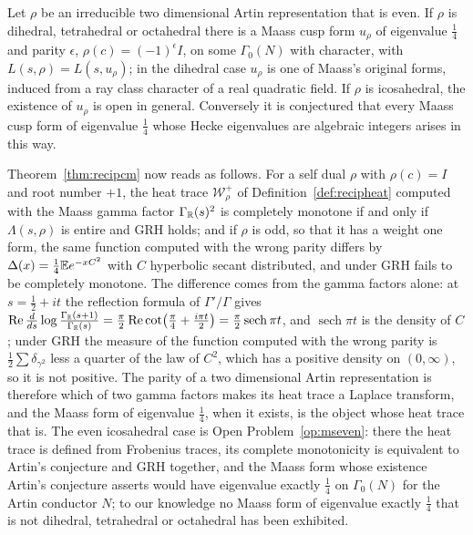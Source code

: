 \begin{theorem}\label{thm:msgalois}
Let $\rho$ be an irreducible two dimensional Artin representation that is even. If $\rho$ is dihedral, tetrahedral or octahedral there is a Maass cusp form $u_\rho$ of eigenvalue $\frac14$ and parity $\epsilon$, $\rho(c)=(-1)^\epsilon I$, on some $\Gamma_0(N)$ with character, with $L(s,\rho)=L(s,u_\rho)$; in the dihedral case $u_\rho$ is one of Maass's original forms, induced from a ray class character of a real quadratic field. If $\rho$ is icosahedral, the existence of $u_\rho$ is open in general. Conversely it is conjectured that every Maass cusp form of eigenvalue $\frac14$ whose Hecke eigenvalues are algebraic integers arises in this way.
\end{theorem}

Theorem~\ref{thm:recipcm} now reads as follows. For a self dual $\rho$ with $\rho(c)=I$ and root number $+1$, the heat trace $\mathcal W_\rho^+$ of Definition~\ref{def:recipheat} computed with the Maass gamma factor $\Gamma_{\mathbb{R}}(s)^2$ is completely monotone if and only if $\Lambda(s,\rho)$ is entire and GRH holds; and if $\rho$ is odd, so that it has a weight one form, the same function computed with the wrong parity differs by $\Delta(x)=\frac14\mathbb{E} e^{-xC^2}$ with $C$ hyperbolic secant distributed, and under GRH fails to be completely monotone. The difference comes from the gamma factors alone: at $s=\frac12+it$ the reflection formula of $\Gamma'/\Gamma$ gives $\operatorname{Re}\frac d{ds}\log\frac{\Gamma_{\mathbb{R}}(s+1)}{\Gamma_{\mathbb{R}}(s)}=\frac\pi2\operatorname{Re}\cot\bigl(\frac\pi4+\frac{i\pi t}2\bigr)=\frac\pi2\operatorname{sech}\pi t$, and $\operatorname{sech}\pi t$ is the density of $C$; under GRH the measure of the function computed with the wrong parity is $\frac12\sum\delta_{\gamma^2}$ less a quarter of the law of $C^2$, which has a positive density on $(0,\infty)$, so it is not positive. The parity of a two dimensional Artin representation is therefore which of two gamma factors makes its heat trace a Laplace transform, and the Maass form of eigenvalue $\frac14$, when it exists, is the object whose heat trace that is. The even icosahedral case is Open Problem~\ref{op:mseven}: there the heat trace is defined from Frobenius traces, its complete monotonicity is equivalent to Artin's conjecture and GRH together, and the Maass form whose existence Artin's conjecture asserts would have eigenvalue exactly $\frac14$ on $\Gamma_0(N)$ for the Artin conductor $N$; to our knowledge no Maass form of eigenvalue exactly $\frac14$ that is not dihedral, tetrahedral or octahedral has been exhibited.

